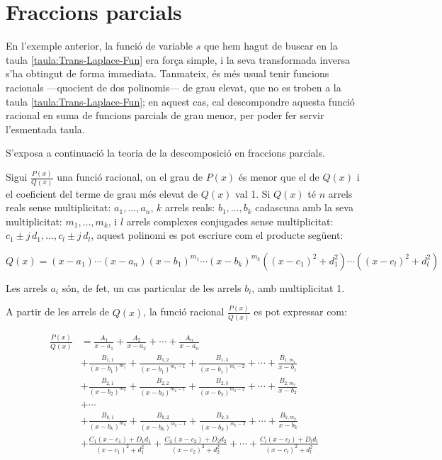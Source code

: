 \section{Fraccions parcials}

En l'exemple anterior, la funció de variable $s$ que hem hagut de
buscar en la taula \vref{taula:Trans-Laplace-Fun} era força simple, i la seva transformada inversa s'ha obtingut de forma
immediata. Tanmateix, és més usual tenir funcions racionals ---quocient de dos polinomis--- de grau elevat, que no es troben a la taula \ref{taula:Trans-Laplace-Fun}; en aquest cas, cal
descompondre aquesta funció racional en suma de funcions parcials de grau menor, per poder fer servir l'esmentada taula.

S'exposa a continuació la teoria de la descomposició en fraccions
parcials.

Sigui $\frac{P(x)}{Q(x)}$ una funció racional, on el grau de $P(x)$
és menor que el de $Q(x)$ i el coeficient del terme de grau més
elevat de $Q(x)$ val 1. Si $Q(x)$ té $n$ arrels reals sense
multiplicitat: $a_1,\ldots,a_n$, $k$ arrels reals: $b_1,\ldots,b_k$
cadascuna amb la seva multiplicitat: $m_1,\ldots,m_k$, i $l$ arrels
complexes conjugades sense multiplicitat: $c_1\pm
j\,d_1,\ldots,c_l\pm j\,d_l$, aquest polinomi es pot escriure
com el producte següent:

\begin{equation}
    Q(x)= (x-a_1) \cdots (x-a_n)(x-b_1)^{m_1} \cdots (x-b_k)^{m_k}
    ((x-c_1)^2+d_1^2)\cdots((x-c_l)^2+d_l^2)
\end{equation}

Les arrels $a_i$ són, de fet, un cas particular de les arrels $b_i$,
amb multiplicitat 1.

A partir de les arrels de $Q(x)$, la funció  racional
$\frac{P(x)}{Q(x)}$ es pot expressar com:

\begin{equation}\begin{split}
    \frac{P(x)}{Q(x)} &= \frac{A_1}{x-a_1} + \frac{A_2}{x-a_2}
    + \cdots + \frac{A_n}{x-a_n}  \\[1.5ex]
   &+ \frac{B_{1,1}}{(x-b_1)^{m_1}} + \frac{B_{1,2}}{(x-b_1)^{m_1-1}}
   + \frac{B_{1,3}}{(x-b_1)^{m_1-2}} + \cdots +
   \frac{B_{1,m_1}}{x-b_1} \\[1.5ex]
&+ \frac{B_{2,1}}{(x-b_2)^{m_2}} + \frac{B_{2,2}}{(x-b_2)^{m_2-1}}
   + \frac{B_{2,3}}{(x-b_2)^{m_2-2}} + \cdots  +
   \frac{B_{2,m_2}}{x-b_2} \\[1.5ex]
   &+ \cdots \\[1ex]
&+ \frac{B_{k,1}}{(x-b_k)^{m_k}} + \frac{B_{k,2}}{(x-b_k)^{m_k-1}}
   + \frac{B_{k,3}}{(x-b_k)^{m_k-2}} + \cdots +
   \frac{B_{k,m_k}}{x-b_k}\\[1.5ex]
&+ \frac{C_1(x-c_1)+D_1 d_1}{(x-c_1)^2+d_1^2}+ \frac{C_2(x-c_2)+D_2
d_2}{(x-c_2)^2+d_2^2} +  \cdots +\frac{C_l(x-c_l)+D_l d_l}{(x-c_l)^2+d_l^2}\\[1.5ex]
\end{split}\end{equation}


